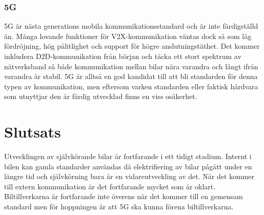 \documentclass[a4paper]{IEEEtran}
\begin{document}
\subsubsection{5G}
5G är nästa generations mobila kommunikationsstandard och är inte färdigställd än. Många lovande funktioner för V2X-kommunikation väntas dock så som låg fördröjning, hög pålitlighet och support för högre anslutningstäthet.
Det kommer inkludera D2D-kommunikation från början och täcka ett stort spektrum av nätverksband så både kommunikation mellan bilar nära varandra och långt ifrån varandra är stabil.
5G är alltså en god kandidat till att bli standarden för denna typen av kommunikation, men eftersom varken standarden eller faktisk hårdvara som utnyttjar den är färdig utvecklad finns en viss osäkerhet.

\section{Slutsats}
Utvecklingen av självkörande bilar är fortfarande i ett tidigt stadium. Internt i bilen kan gamla standarder användas då elektrifiering av bilar pågått under en längre tid och självkörning bara är en vidareutveckling av det. När det kommer till extern kommunikation är det fortfarande mycket som är oklart. Biltillverkarna är fortfarande inte överens när det kommer till en gemensam standard men för hoppningen är att 5G ska kunna förena biltillverkarna.
\end{document}
